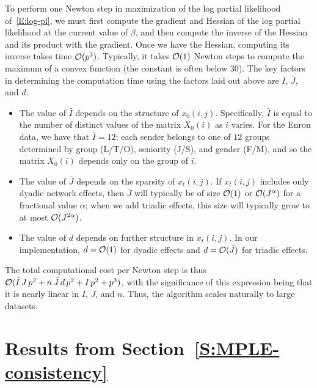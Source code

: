 \documentclass[final]{statsoc}
\begin{document}
To perform one Newton step in maximization of the log partial likelihood of~\eqref{E:log-pl}, we must first compute the gradient and Hessian of the
log partial likelihood at the current value of $\beta$, and then compute the
inverse of the Hessian and its product with the gradient.  Once we have the
Hessian, computing its inverse takes time $\mathcal{O}(p^3)$.  Typically, it takes
$\mathcal{O}(1)$ Newton steps to compute the maximum of a convex function (the
constant is often below $30$).  The key factors in determining the
computation time using the factors laid out above are $\bar I$, $\bar J$, and
$d$:

\begin{itemize}

\item The value of $\bar I$ depends on the structure of $x_0(i,j)$.  Specifically,
$\bar I$ is equal to the number of
distinct values of the matrix $X_0(i)$ as $i$
varies.  For the Enron data, we have that $\bar I = 12$: each sender
belongs to one of $12$ groups determined by group (L/T/O), seniority (J/S),
and gender (F/M), and so the matrix $X_0(i)$ depends only on the group of $i$.

\item The value of $\bar J$ depends on the sparsity of $x_t(i,j)$.  If
$x_t(i,j)$ includes only dyadic network effects, then $\bar J$ will typically
be of size $\mathcal{O}(1)$ or $\mathcal{O}(J^\alpha)$ for a fractional value $\alpha$; when we add triadic effects, this size will typically
grow to at most $\mathcal{O}(J^{2 \alpha})$.

\item The value of $d$ depends on further structure in $x_t(i,j)$.  In our
implementation, $d = \mathcal{O}(1)$ for dyadic effects and $d = \mathcal{O}(\bar J)$ for
triadic effects.

\end{itemize}

The total computational cost per Newton step is thus
$\mathcal{O}(\bar I \, J \, p^2  + n \, \bar J \, d \, p^2 + I \, p^2 + p^3)$, with
the significance of this expression being that it is nearly linear
in $I$, $J$, and $n$.  Thus, the algorithm scales naturally to large
datasets.


\newcommand{\MPLEconsistencysection}{\ref{S:MPLE-consistency}}
\section{Results from Section~\protect\MPLEconsistencysection{}}
\label{S:MPLE-consistency-proofs}
\end{document}
